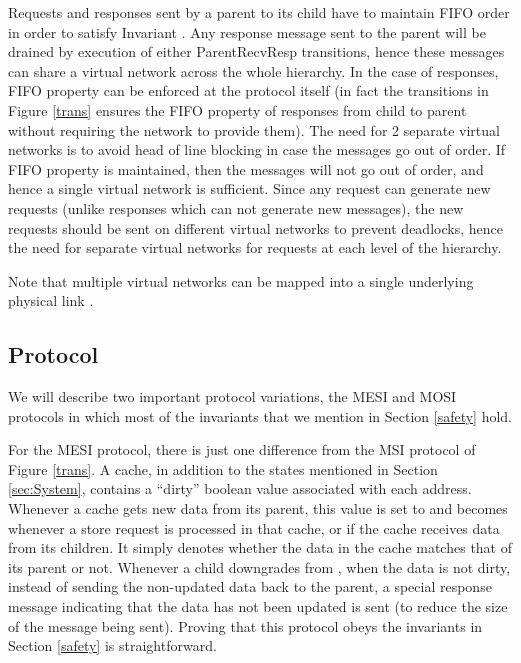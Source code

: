 Requests and responses sent by a parent to its child have to maintain FIFO
order in order to satisfy Invariant . Any response message sent
to the parent will be drained by execution of either ParentRecvResp
transitions, hence these messages can share a virtual network across the whole
hierarchy. In the case of responses, FIFO property can be enforced at the
protocol itself (in fact the transitions in Figure \ref{trans} ensures the FIFO
property of responses from child to parent without requiring the network to
provide them). The need for 2 separate virtual networks is to avoid head of
line blocking in case the messages go out of order. If FIFO property is
maintained, then the messages will not go out of order, and hence a single
virtual network is sufficient.  Since any request can generate new requests
(unlike responses which can not generate new messages), the new requests should
be sent on different virtual networks to prevent deadlocks, hence the need for
separate virtual networks for requests at each level of the hierarchy.

Note that multiple virtual networks can be mapped into a single underlying
physical link \cite{noc-funda}.


\subsection{Protocol}
We will describe two important protocol variations, the MESI and MOSI protocols
in which most of the invariants that we mention in Section \ref{safety} hold.

For the MESI protocol, there is just one difference from the MSI protocol of
Figure \ref{trans}. A cache, in addition to the states mentioned in Section
\ref{sec:System}, contains a ``dirty'' boolean value associated with each
address.  Whenever a cache gets new data from its parent, this value is set to
\False{} and becomes \True{} whenever a store request is processed in that
cache, or if the cache receives data from its children. It simply denotes
whether the data in the cache matches that of its parent or not.  Whenever a
child downgrades from \Mo{}, when the data is not dirty, instead of sending the
non-updated data back to the parent, a special response message indicating that
the data has not been updated is sent (to reduce the size of the message being
sent). Proving that this protocol obeys the invariants in Section \ref{safety}
is straightforward.


